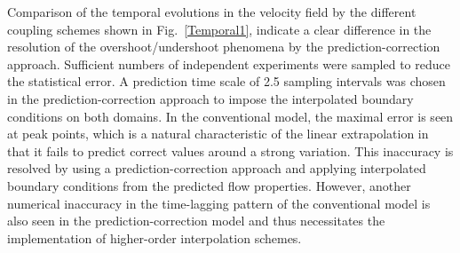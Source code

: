 \documentclass[preprint,12pt]{elsarticle}
\begin{document}

Comparison of the temporal evolutions in the velocity field by the different coupling schemes shown in Fig.~\ref{Temporal1}, indicate a clear difference in the resolution of the overshoot/undershoot phenomena by the prediction-correction approach. Sufficient numbers of independent experiments were sampled to reduce the statistical error. A prediction time scale of 2.5 sampling intervals was chosen in the prediction-correction approach to impose the interpolated boundary conditions on both domains. In the conventional model, the maximal error is seen at peak points, which is a natural characteristic of the linear extrapolation in that it fails to predict correct values around a strong variation. This inaccuracy is resolved by using a prediction-correction approach and applying interpolated boundary conditions from the predicted flow properties. However, another numerical inaccuracy in the time-lagging pattern of the conventional model is also seen in the prediction-correction model and thus necessitates the implementation of higher-order interpolation schemes.
\end{document}
